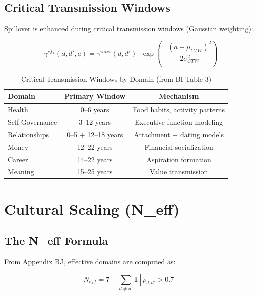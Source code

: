 \subsection{Critical Transmission Windows}

Spillover is enhanced during critical transmission windows (Gaussian weighting):

\begin{equation}
\gamma^{eff}(d, d', a) = \gamma^{inter}(d, d') \cdot \exp\left(-\frac{(a - \mu_{CTW})^2}{2\sigma_{CTW}^2}\right)
\label{eq:ctw-weighting}
\end{equation}

\begin{table}[htbp]
\centering
\caption{Critical Transmission Windows by Domain (from BI Table 3)}
\label{tab:ctw}
\renewcommand{\arraystretch}{1.2}
\begin{tabular}{@{}lcc@{}}
\toprule
\textbf{Domain} & \textbf{Primary Window} & \textbf{Mechanism} \\
\midrule
Health & 0--6 years & Food habits, activity patterns \\
Self-Governance & 3--12 years & Executive function modeling \\
Relationships & 0--5 + 12--18 years & Attachment + dating models \\
Money & 12--22 years & Financial socialization \\
Career & 14--22 years & Aspiration formation \\
Meaning & 15--25 years & Value transmission \\
\bottomrule
\end{tabular}
\end{table}


\section{Cultural Scaling (N\_eff)}
\label{sec:calc-neff}

\subsection{The N\_eff Formula}

From Appendix BJ, effective domains are computed as:

\begin{equation}
\boxed{
N_{eff} = 7 - \sum_{d \neq d'} \mathbf{1}[\rho_{d,d'} > 0.7]
}
\label{eq:neff}
\end{equation}


